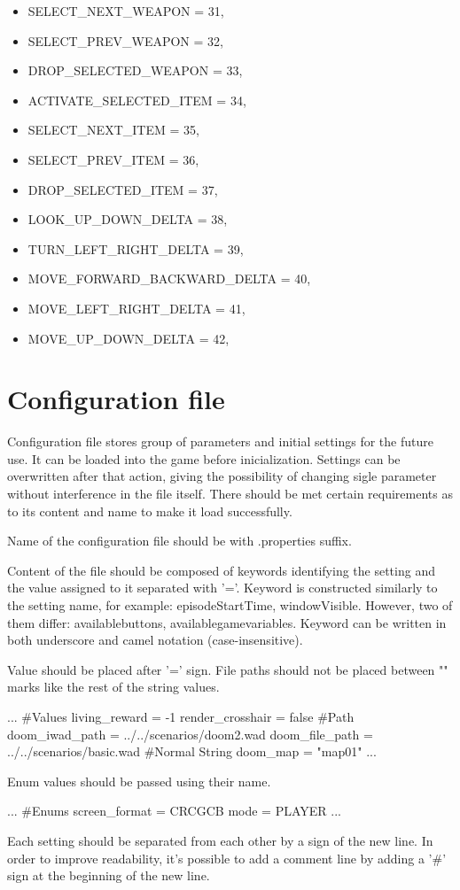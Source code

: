 \begin{itemize}
\item     SELECT\_NEXT\_WEAPON = 31,
 \item        SELECT\_PREV\_WEAPON = 32,
\item         DROP\_SELECTED\_WEAPON = 33,

 \item        ACTIVATE\_SELECTED\_ITEM = 34,
 \item        SELECT\_NEXT\_ITEM = 35,
 \item        SELECT\_PREV\_ITEM = 36,
 \item        DROP\_SELECTED\_ITEM = 37,

 \item        LOOK\_UP\_DOWN\_DELTA = 38,
 \item        TURN\_LEFT\_RIGHT\_DELTA = 39,
 \item        MOVE\_FORWARD\_BACKWARD\_DELTA = 40,
 \item        MOVE\_LEFT\_RIGHT\_DELTA = 41,
 \item        MOVE\_UP\_DOWN\_DELTA = 42,
\end{itemize}
\section{Configuration file}\label{sec:configuration_file}


Configuration file stores group of parameters and initial settings for the future use. It can be loaded into the game before inicialization. Settings can be overwritten after that action, giving the possibility of changing sigle parameter without interference in the file itself. There should be met certain requirements as to its content and name to make it load successfully.

Name of the configuration file should be with .properties suffix.

Content of the file should be composed of keywords identifying the setting and the value assigned to it separated with '='. Keyword is constructed similarly to the setting name, for example: episodeStartTime, windowVisible. However, two of them differ: availablebuttons, availablegamevariables.
Keyword can be written in both underscore and camel notation (case-insensitive). 


Value should be placed after '=' sign. File paths should not be placed between "" marks like the rest of the string values.
\begin{cblock}
...
#Values
living_reward = -1
render_crosshair = false
#Path
doom_iwad_path = ../../scenarios/doom2.wad
doom_file_path = ../../scenarios/basic.wad
#Normal String
doom_map = "map01"
...
\end{cblock}
Enum values should be passed using their name.
\begin{cblock}
...
#Enums
screen_format = CRCGCB
mode = PLAYER
...
\end{cblock}
Each setting should be separated from each other by a sign of the new line. In order to improve readability, it's possible to add a comment line by adding a '\#' sign at the beginning of the new line.


